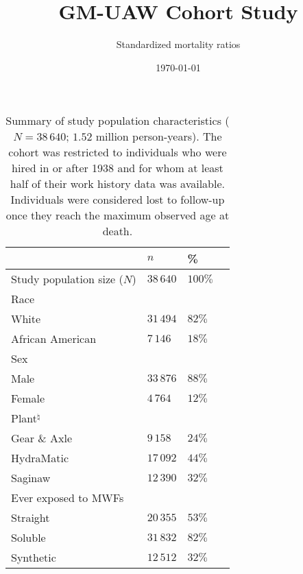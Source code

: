 \documentclass[]{article}
\title{GM-UAW Cohort Study}
\subtitle{Standardized mortality ratios}
\author{}
\date{\today}
\begin{document}
\maketitle

\renewcommand{\arraystretch}{1.1}

\renewcommand{\headrulewidth}{0pt}

\begin{table}[H]
\centering
\caption{Summary of study population characteristics ($N =38\,640$; $1.52$ million person-years). The cohort was restricted to individuals who were hired in or after 1938 and for whom at least half of their work history data was available. Individuals were considered lost to follow-up once they reach the maximum observed age at death.} 
\label{tab1.tab}
\begin{tabular}{p{7cm}R{1.5cm}R{1.5cm}R{1.5cm}}
  \toprule
 & $n$ & \% &   \\ 
  \midrule
Study population size ($N$) & $38\,640$ & $100\%$ &  \\ 
  Race &  &  &  \\ 
  \hspace{10pt}White & $31\,494$ & $82 \%$ &  \\ 
  \hspace{10pt}African American & $7\,146$ & $18 \%$ &  \\ 
  Sex &  &  &  \\ 
  \hspace{10pt}Male & $33\,876$ & $88 \%$ &  \\ 
  \hspace{10pt}Female & $4\,764$ & $12 \%$ &  \\ 
  Plant$^\natural$ &  &  &  \\ 
  \hspace{10pt}Gear \& Axle & $9\,158$ & $24 \%$ &  \\ 
  \hspace{10pt}HydraMatic & $17\,092$ & $44 \%$ &  \\ 
  \hspace{10pt}Saginaw & $12\,390$ & $32 \%$ &  \\ 
  Ever exposed to MWFs &  &  &  \\ 
  \hspace{10pt}Straight & $20\,355$ & $53 \%$ &  \\ 
  \hspace{10pt}Soluble & $31\,832$ & $82 \%$ &  \\ 
  \hspace{10pt}Synthetic & $12\,512$ & $32 \%$ &  \\ 

\end{tabular}
\end{table}
\end{document}
